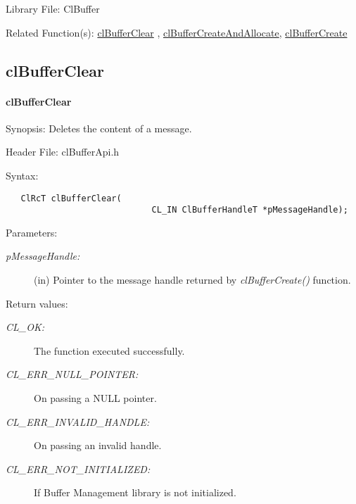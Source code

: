 \begin{Desc}
\item[Library File:]Cl\-Buffer\end{Desc}
\begin{Desc}
\item[Related Function(s):]\hyperlink{pagebuf105}{cl\-Buffer\-Clear} , \hyperlink{pagebuf104}{cl\-Buffer\-Create\-And\-Allocate},
\hyperlink{pagebuf103}{cl\-Buffer\-Create} \end{Desc}


\newpage
\subsection{clBufferClear}
\hypertarget{pagebuf106}{}\paragraph{cl\-Buffer\-Clear}\label{pagebuf106}
\begin{Desc}
\item[Synopsis:]Deletes the content of a message.\end{Desc}
\begin{Desc}
\item[Header File:]clBufferApi.h\end{Desc}
\begin{Desc}
\item[Syntax:]

\footnotesize\begin{verbatim}   ClRcT clBufferClear(
                             CL_IN ClBufferHandleT *pMessageHandle);
\end{verbatim}
\normalsize
\end{Desc}
\begin{Desc}
\item[Parameters:]
\begin{description}
\item[{\em p\-Message\-Handle:}](in) Pointer to the message handle returned by \textit{clBufferCreate()} function.\end{description}
\end{Desc}
\begin{Desc}
\item[Return values:]
\begin{description}
\item[{\em CL\_\-OK:}]The function executed successfully. \item[{\em CL\_\-ERR\_\-NULL\_\-POINTER:}]On passing a NULL pointer. \item[{\em CL\_\-ERR\_\-INVALID\_\-HANDLE:}]On passing an invalid handle. \item[{\em CL\_\-ERR\_\-NOT\_\-INITIALIZED:}]If Buffer Management library is not initialized.\end{description}
\end{Desc}
